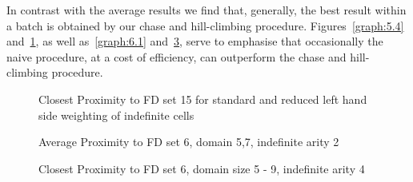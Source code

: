 {In contrast with the average results we find that, generally, the
best result within a batch is obtained by our chase and hill-climbing
procedure. Figures~\ref{graph:5.4} and~\ref{graph:5.5}, as well
as~\ref{graph:6.1} and~\ref{graph:5.15}, serve to emphasise that
occasionally the naive procedure, at a cost of efficiency, can
outperform the chase and hill-climbing procedure.


\begin{figure}
\begin{minipage}{7cm}
\centerline{}
\caption{\label{graph:5.4} {Closest Proximity to FD set 15 for
standard and reduced right hand side weighting of indefinite cells}}
\end{minipage}
\hfill
\begin{minipage}{7cm}
\centerline{}
\caption{\label{graph:5.5} {Closest Proximity to FD set 15 for
standard and reduced left hand side weighting of indefinite cells }}
\end{minipage}
\end{figure}

\begin{figure}
\begin{minipage}{7cm}
\centerline{}
\caption{\label{graph:5.13} {Average Proximity to  FD set 7, domain
size 7, max indefinite cell arity 6}}
\end{minipage}
\hfill
\begin{minipage}{7cm}
\centerline{}
\caption{\label{graph:5.14} {Average Proximity to FD set 6, domain
5,7, indefinite arity 2}}
\end{minipage}
\end{figure}
\newpage

\begin{figure}
\begin{minipage}{7cm}
\centerline{}
\caption{\label{graph:6.1} {Closest Proximity to FD set 15, varying
domain sizes 5 - 9, chase and naive approaches, indefinite arity 4}}
\end{minipage}
\hfill
\begin{minipage}{7cm}
\centerline{}
\caption{\label{graph:5.15} {Closest Proximity to FD set 6, domain
size 5 - 9, indefinite arity 4}}
\end{minipage}
\end{figure}


}
